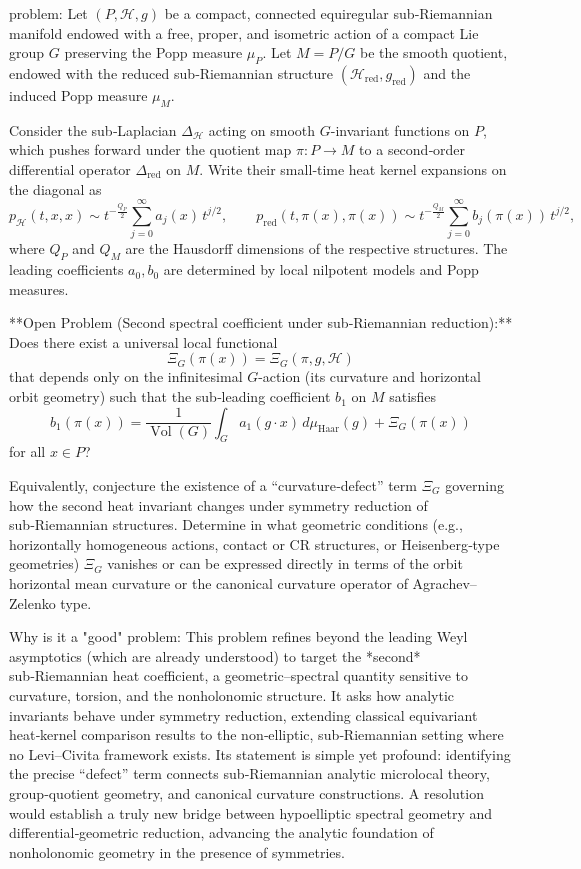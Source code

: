 problem:  
Let \((P, \mathcal{H}, g)\) be a compact, connected equiregular sub‑Riemannian manifold endowed with a free, proper, and isometric action of a compact Lie group \(G\) preserving the Popp measure \(\mu_P\). Let \(M = P/G\) be the smooth quotient, endowed with the reduced sub‑Riemannian structure \((\mathcal{H}_{\mathrm{red}}, g_{\mathrm{red}})\) and the induced Popp measure \(\mu_M\).  

Consider the sub‑Laplacian \(\Delta_{\mathcal{H}}\) acting on smooth \(G\)-invariant functions on \(P\), which pushes forward under the quotient map \(\pi: P \to M\) to a second‑order differential operator \(\Delta_{\mathrm{red}}\) on \(M\).  Write their small‑time heat kernel expansions on the diagonal as  
\[
p_{\mathcal{H}}(t,x,x) \sim t^{-\frac{Q_P}{2}} \!\sum_{j=0}^{\infty}\! a_j(x)\, t^{j/2}, 
\qquad
p_{\mathrm{red}}(t,\pi(x),\pi(x)) \sim t^{-\frac{Q_M}{2}} \!\sum_{j=0}^{\infty}\! b_j(\pi(x))\, t^{j/2},
\]
where \(Q_P\) and \(Q_M\) are the Hausdorff dimensions of the respective structures.  The leading coefficients \(a_0,b_0\) are determined by local nilpotent models and Popp measures.

**Open Problem (Second spectral coefficient under sub‑Riemannian reduction):**  
Does there exist a universal local functional  
\[
\Xi_G(\pi(x)) = \Xi_G(\pi,g,\mathcal{H})
\]
that depends only on the infinitesimal \(G\)-action (its curvature and horizontal orbit geometry) such that the sub‑leading coefficient \(b_1\) on \(M\) satisfies
\[
b_1(\pi(x)) 
= 
\frac{1}{\operatorname{Vol}(G)} 
\int_G\!\! a_1(g\!\cdot\! x)\, d\mu_{\mathrm{Haar}}(g)
+ \Xi_G(\pi(x))
\]
for all \(x\in P\)?  

Equivalently, conjecture the existence of a “curvature‑defect” term \(\Xi_G\) governing how the second heat invariant changes under symmetry reduction of sub‑Riemannian structures.  Determine in what geometric conditions (e.g., horizontally homogeneous actions, contact or CR structures, or Heisenberg‑type geometries) \(\Xi_G\) vanishes or can be expressed directly in terms of the orbit horizontal mean curvature or the canonical curvature operator of Agrachev–Zelenko type.

Why is it a "good" problem:  
This problem refines beyond the leading Weyl asymptotics (which are already understood) to target the *second* sub‑Riemannian heat coefficient, a geometric–spectral quantity sensitive to curvature, torsion, and the nonholonomic structure. It asks how analytic invariants behave under symmetry reduction, extending classical equivariant heat‑kernel comparison results to the non‑elliptic, sub‑Riemannian setting where no Levi–Civita framework exists. Its statement is simple yet profound: identifying the precise “defect” term connects sub‑Riemannian analytic microlocal theory, group‑quotient geometry, and canonical curvature constructions.  A resolution would establish a truly new bridge between hypoelliptic spectral geometry and differential‑geometric reduction, advancing the analytic foundation of nonholonomic geometry in the presence of symmetries.